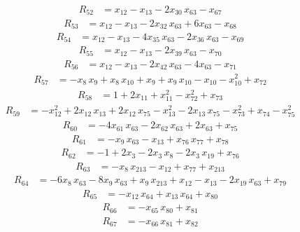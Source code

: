 \begin{align*}
R_{52} &= x_{12} -x_{13} -2x_{30}\,x_{63} -x_{67}
\end{align*}
\begin{align*}
R_{53} &= x_{12} -x_{13} -2x_{32}\,x_{63} +6x_{63} -x_{68}
\end{align*}
\begin{align*}
R_{54} &= x_{12} -x_{13} -4x_{35}\,x_{63} -2x_{36}\,x_{63} -x_{69}
\end{align*}
\begin{align*}
R_{55} &= x_{12} -x_{13} -2x_{39}\,x_{63} -x_{70}
\end{align*}
\begin{align*}
R_{56} &= x_{12} -x_{13} -2x_{42}\,x_{63} -4x_{63} -x_{71}
\end{align*}
\begin{align*}
R_{57} &= -x_{8}\,x_{9} +x_{8}\,x_{10} +x_{9} +x_{9}\,x_{10} -x_{10} -x_{10}^{2} +x_{72}
\end{align*}
\begin{align*}
R_{58} &= 1 +2x_{11} +x_{11}^{2} -x_{72}^{2} +x_{73}
\end{align*}
\begin{align*}
R_{59} &= -x_{12}^{2} +2x_{12}\,x_{13} +2x_{12}\,x_{75} -x_{13}^{2} -2x_{13}\,x_{75} -x_{73}^{2} +x_{74} -x_{75}^{2}
\end{align*}
\begin{align*}
R_{60} &= -4x_{61}\,x_{63} -2x_{62}\,x_{63} +2x_{63} +x_{75}
\end{align*}
\begin{align*}
R_{61} &= -x_{9}\,x_{63} -x_{13} +x_{76}\,x_{77} +x_{78}
\end{align*}
\begin{align*}
R_{62} &= -1 +2x_{3} -2x_{3}\,x_{8} -2x_{3}\,x_{19} +x_{76}
\end{align*}
\begin{align*}
R_{63} &= -x_{8}\,x_{213} -x_{12} +x_{77} +x_{213}
\end{align*}
\begin{align*}
R_{64} &= -6x_{8}\,x_{63} -8x_{9}\,x_{63} +x_{9}\,x_{213} +x_{12} -x_{13} -2x_{19}\,x_{63} +x_{79}
\end{align*}
\begin{align*}
R_{65} &= -x_{12}\,x_{64} +x_{13}\,x_{64} +x_{80}
\end{align*}
\begin{align*}
R_{66} &= -x_{65}\,x_{80} +x_{81}
\end{align*}
\begin{align*}
R_{67} &= -x_{66}\,x_{81} +x_{82}
\end{align*}
